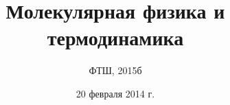 \documentclass{article}
\begin{document}
 
\title{Молекулярная физика и термодинамика}
\author{ФТШ, 2015б}
\date{20 февраля 2014 г.}
\maketitle


\tableofcontents
 





 
\end{document}
